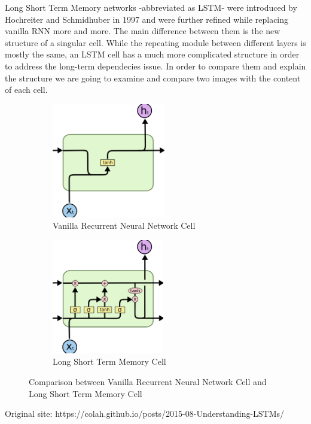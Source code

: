 Long Short Term Memory networks -abbreviated as LSTM- were introduced by Hochreiter and Schmidhuber in 1997 \cite{hochreiter1997long} and were further refined while replacing vanilla RNN more and more. The main difference between them is the new structure of a singular cell. While the repeating module between different layers is mostly the same, an LSTM cell has a much more complicated structure in order to address the long-term dependecies issue. In order to compare them and explain the structure we are going to examine and compare two images with the content of each cell.

\begin{figure}[H]

\begin{subfigure}{0.5\textwidth}
\includegraphics[width=0.9\linewidth, height=5cm]{images/VanillaRNNCell.png} 
\caption{Vanilla Recurrent Neural Network Cell}
\label{fig:vanillarnncell}
\end{subfigure}
\begin{subfigure}{0.5\textwidth}
\includegraphics[width=0.9\linewidth, height=5cm]{images/LSTMCell.png}
\caption{Long Short Term Memory Cell}
\label{fig:lstmcell}
\end{subfigure}

\caption{Comparison between Vanilla Recurrent Neural Network Cell and Long Short Term Memory Cell}
\label{fig:rnnandlstmcomparison}
\end{figure}
\begin{flushright}
Original site: https://colah.github.io/posts/2015-08-Understanding-LSTMs/
\end{flushright}




